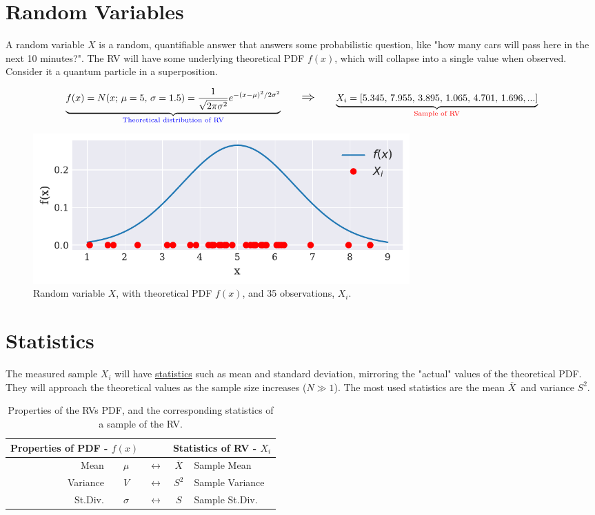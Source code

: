 \documentclass[12p,a4paper]{report}
\renewcommand{\exp}{e^}
\renewcommand{\exp}{e^}
\renewcommand{\bar}{\overline}
\newcommand{\lRightarrow}{\mathlarger{\mathlarger{\Rightarrow}}}
\begin{document}
\section*{Random Variables}
A random variable $X$ is a random, quantifiable answer that answers some probabilistic question, like "how many cars will pass here in the next 10 minutes?". The RV will have some underlying theoretical PDF $f(x)$, which will collapse into a single value when observed. Consider it a quantum particle in a superposition.


\begin{align*}
    \underbrace{
        f(x) = N(x;\, \mu=5,\, \sigma=1.5) = \frac{1}{\sqrt{2\pi\sigma^2}}\exp{-(x-\mu)^2/2\sigma^2}
    }_{\text{\textcolor{blue}{Theoretical distribution of RV}} }
    \quad\quad \lRightarrow \quad\quad
    \underbrace{
        X_i = [5.345,\, 7.955,\, 3.895,\, 1.065,\, 4.701,\, 1.696,...]
    }_{\text{\textcolor{red}{Sample of RV}}}
\end{align*}
\begin{figure}[H]
    \centering
    \includegraphics[width=0.7\textwidth]{figs/RV:1.pdf}
    \caption{Random variable $X$, with theoretical PDF $f(x)$, and 35 observations, $X_i$.}
    \label{fig:1}
\end{figure}

\section*{Statistics}
The measured sample $X_i$ will have \underline{statistics} such as mean and standard deviation, mirroring the "actual" values of the theoretical PDF. They will approach the theoretical values as the sample size increases ($N\gg 1$). The most used statistics are the mean $\bar{X}$ and variance $S^2$.

\begin{table}[H]
    \centering
    \begin{tabular}{r  c  c  c  l}\toprule
        \multicolumn{2}{c}{\bf{Properties of PDF - $f(x)$}}  & &  \multicolumn{2}{c}{\bf{Statistics of RV - $X_i$}} \\ \midrule
        Mean  &  $\mu$  & $\leftrightarrow$ &  $\bar{X}$  &  Sample Mean  \\ \midrule
        Variance  &  $V$  & $\leftrightarrow$ &  $S^2$  &  Sample Variance \\ \midrule
        St.Div.  &  $\sigma$  & $\leftrightarrow$ &  $S$  &  Sample St.Div.
    \end{tabular}
    \caption{Properties of the RVs PDF, and the corresponding statistics of a sample of the RV.}
    \label{table:1}
\end{table}
\end{document}
